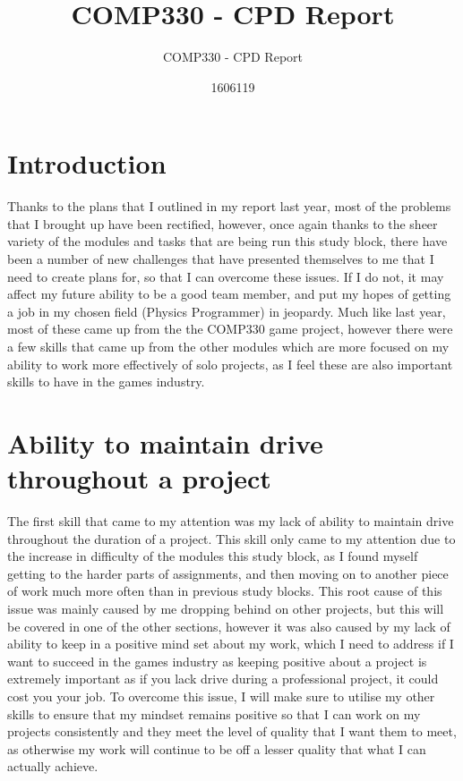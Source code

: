 \documentclass{scrartcl}
\title{COMP330 - CPD Report}
\subtitle{COMP330 - CPD Report}
\author{1606119}
\begin{document}
\maketitle

\section{Introduction}
Thanks to the plans that I outlined in my report last year, most of the problems that I brought up have been rectified, however, once again thanks to the sheer variety of the modules and tasks that are being run this study block, there have been a number of new challenges that have presented themselves to me that I need to create plans for, so that I can overcome these issues. If I do not, it may affect my future ability to be a good team member, and put my hopes of getting a job in my chosen field (Physics Programmer) in jeopardy. Much like last year, most of these came up from the the COMP330 game project, however there were a few skills that came up from the other modules which are more focused on my ability to work more effectively of solo projects, as I feel these are also important skills to have in the games industry. 

\section{Ability to maintain drive throughout a project}
The first skill that came to my attention was my lack of ability to maintain drive throughout the duration of a project. This skill only came to my attention due to the increase in difficulty of the modules this study block, as I found myself getting to the harder parts of assignments, and then moving on to another piece of work much more often than in previous study blocks. This root cause of this issue was mainly caused by me dropping behind on other projects, but this will be covered in one of the other sections, however it was also caused by my lack of ability to keep in a positive mind set about my work, which I need to address if I want to succeed in the games industry as keeping positive about a project is extremely important as if you lack drive during a professional project, it could cost you your job. To overcome this issue, I will make sure to utilise my other skills to ensure that my mindset remains positive so that I can work on my projects consistently and they meet the level of quality that I want them to meet, as otherwise my work will continue to be off a lesser quality that what I can actually achieve. 
\end{document}
